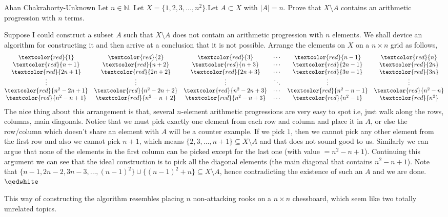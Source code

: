 \begin{problem}{7}{Ahan Chakraborty-Unknown} 
	Let $n\in \mathbb{N}$. Let $X=\{1,2,3,...,n^2\}.$Let $A\subset X$ with $|A| = n$. Prove that $X\setminus A$ contains an arithmetic progression with $n$ terms.
	\begin{solution} Suppose I could construct a subset $A$ such that $X\setminus A$ does not contain an arithmetic progression with $n$ elements. We shall device an algorithm for constructing it and then arrive at a conclusion that it is not possible. Arrange the elements on $X$ on a $n\times n$ grid as follows,
$$
	\begin{matrix}
		\textcolor{red}{1} & \textcolor{red}{2} & \textcolor{red}{3} &\cdots & \textcolor{red}{n-1} & \textcolor{red}{n}\\
		\textcolor{red}{n+1} & \textcolor{red}{n+2} & \textcolor{red}{n+3} & \cdots & \textcolor{red}{2n-1} & \textcolor{red}{2n}\\
                \textcolor{red}{2n+1} & \textcolor{red}{2n+2} & \textcolor{red}{2n+3} & \cdots & \textcolor{red}{3n-1} & \textcolor{red}{3n}\\
 
		\vdots & \vdots & \vdots & \ddots & \vdots &\vdots\\
                \textcolor{red}{n^2-2n+1} & \textcolor{red}{n^2-2n+2} & \textcolor{red}{n^2-2n+3} & \cdots & \textcolor{red}{n^2-n-1} & \textcolor{red}{n^2-n}\\
		\textcolor{red}{n^2-n+1} & \textcolor{red}{n^2-n+2} & \textcolor{red}{n^2-n+3} & \cdots & \textcolor{red}{n^2-1} & \textcolor{red}{n^2}
	\end{matrix}
	$$
		\indent The nice thing about this arrangement is that, several $n$-element arithmetic progressions are very easy to spot i.e, just walk along the rows, columns, main diagonals. Notice that we must pick exactly one element from each row and column and place it in $A$, or else the row/column which doesn't share an element with $A$ will be a counter example. If we pick $1$, then we cannot pick any other element from the first row and also we cannot pick $n+1$, which means $\{2,3,\ldots, n+1\}\subseteq X\setminus A$ and that does not sound good to us. Similarly we can argue that none of the elements in the first column can be picked except for the last one (with value $=n^2-n+1$). Continuing this argument we can see that the ideal construction is to pick all the diagonal elements (the main diagonal that contains $n^2-n+1$). Note that $\{n-1, 2n-2, 3n-3,\ldots, (n-1)^2\}\cup\{(n-1)^2+n\}\subseteq X\setminus A$, hence contradicting the existence of such an $A$ and we are done. $\qedwhite$

		\begin{remark}[title=Comment.$\hspace{1mm}$]
		This way of constructing the algorithm resembles placing $n$ non-attacking rooks on a $n\times n$ chessboard, which seem like two totally unrelated topics.
	\end{remark}

	\end{solution}
\end{problem}
	

